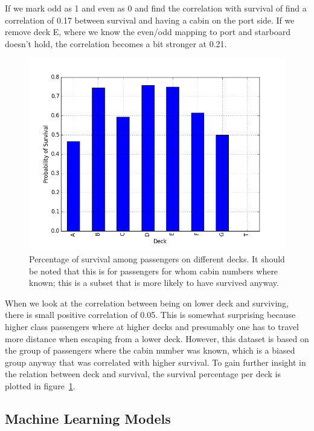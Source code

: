\documentclass{llncs}
\begin{document}
If we mark odd as 1 and even as 0 and find the correlation with survival of find a correlation of 0.17 between survival and having a cabin on the port side. If we remove deck E, where we know the even/odd mapping to port and starboard doesn't hold, the correlation becomes a bit stronger at 0.21.
\begin{figure}[H]
    \centering
    \includegraphics[width=0.4\linewidth]{survival_per_deck}
    \caption{Percentage of survival among passengers on different decks. It should be noted that this is for passengers for whom cabin numbers where known; this is a subset that is more likely to have survived anyway.}
    \label{fig:survival_per_deck}
\end{figure}
\noindent
When we look at the correlation between being on lower deck and surviving, there is small positive correlation of 0.05. This is somewhat surprising because higher class passengers where at higher decks and presumably one has to travel more distance when escaping from a lower deck. However, this dataset is based on the group of passengers where the cabin number was known, which is a biased group anyway that was correlated with higher survival. To gain further insight in the relation between deck and survival, the survival percentage per deck is plotted in figure~\ref{fig:survival_per_deck}.

\subsection{Machine Learning Models}
\label{subsec:titanic_machine_learning_models}
\end{document}
